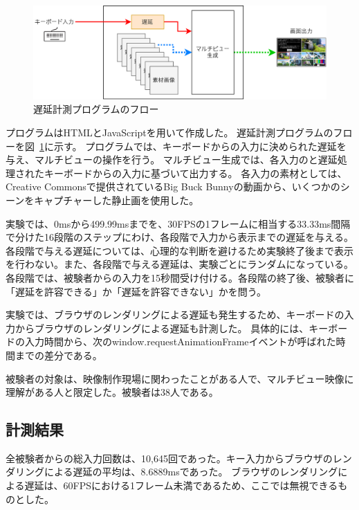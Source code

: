 \newpage
\begin{figure}[htbp]
  \begin{center}
    \includegraphics[bb=0 0 629 201,width=15.5cm]{img/mv-delay-diagram.pdf}
  \end{center}
  \caption{遅延計測プログラムのフロー}
  \label{fig:mv-delay-diagram}
\end{figure}

プログラムはHTMLとJavaScriptを用いて作成した。
遅延計測プログラムのフローを図~\ref{fig:mv-delay-diagram}に示す。
プログラムでは、キーボードからの入力に決められた遅延を与え、マルチビューの操作を行う。
マルチビュー生成では、各入力のと遅延処理されたキーボードからの入力に基づいて出力する。
各入力の素材としては、Creative Commonsで提供されているBig Buck Bunny\cite{big-buck-bunny}の動画から、いくつかのシーンをキャプチャーした静止画を使用した。

実験では、0msから499.99msまでを、30FPSの1フレームに相当する33.33ms間隔で分けた16段階のステップにわけ、各段階で入力から表示までの遅延を与える。
各段階で与える遅延については、心理的な判断を避けるため実験終了後まで表示を行わない。また、各段階で与える遅延は、実験ごとにランダムになっている。
各段階では、被験者からの入力を15秒間受け付ける。各段階の終了後、被験者に「遅延を許容できる」か「遅延を許容できない」かを問う。

実験では、ブラウザのレンダリングによる遅延も発生するため、キーボードの入力からブラウザのレンダリングによる遅延も計測した。
具体的には、キーボードの入力時間から、次のwindow.requestAnimationFrameイベントが呼ばれた時間までの差分である。

被験者の対象は、映像制作現場に関わったことがある人で、マルチビュー映像に理解がある人と限定した。被験者は38人である。

\subsection{計測結果}

全被験者からの総入力回数は、10,645回であった。キー入力からブラウザのレンダリングによる遅延の平均は、8.6889msであった。
ブラウザのレンダリングによる遅延は、60FPSにおける1フレーム未満であるため、ここでは無視できるものとした。


